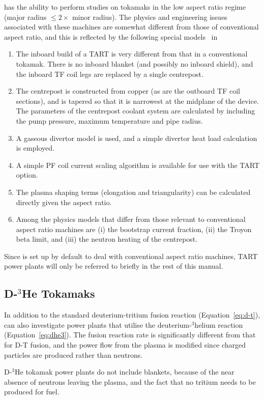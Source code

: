 \PS has the ability to perform studies on tokamaks in the low aspect ratio
regime (major radius $\leq 2 \times$ minor radius). The physics and
engineering issues~\cite{tart} associated with these machines are somewhat
different from those of conventional aspect ratio, and this is reflected by
the following special models~\cite{storac} in \PSD
\begin{enumerate}
\item The inboard build of a TART is very different from that in a
conventional tokamak. There is no inboard blanket (and possibly no inboard
shield), and the inboard TF coil legs are replaced by a single centrepost.
\item The centrepost is constructed from copper (as are the outboard TF coil
sections), and is tapered so that it is narrowest at the midplane of the
device. The parameters of the centrepost coolant system are calculated by \PSC
including the pump pressure, maximum temperature and pipe radius.
\item A gaseous divertor model is used, and a simple divertor heat load
calculation is employed.
\item A simple PF coil current scaling algorithm is available for use with the
TART option.
\item The plasma shaping terms (elongation and triangularity) can be
calculated directly given the aspect ratio.
\item Among the physics models that differ from those relevant to conventional
aspect ratio machines are (i) the bootstrap current fraction, (ii) the Troyon
beta limit, and (iii) the neutron heating of the centrepost.
\end{enumerate}
Since \PS is set up by default to deal with conventional aspect ratio
machines, TART power plants will only be referred to briefly in the rest of
this manual.

\subsection{D-$^3$He Tokamaks}

In addition to the standard deuterium-tritium fusion reaction
(Equation~\ref{eq:d-t}), \PS can also investigate power plants that utilise
the deuterium-$^3$helium reaction (Equation~\ref{eq:dhe3}). The fusion
reaction rate is significantly different from that for D-T fusion, and the
power flow from the plasma is modified since charged particles are produced
rather than neutrons.

D-$^3$He tokamak power plants do not include blankets, because of the near
absence of neutrons leaving the plasma, and the fact that no tritium needs to
be produced for fuel.

